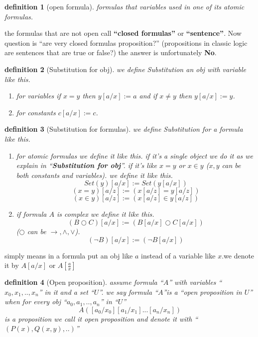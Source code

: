 \documentclass[10pt,a4paper]{book}
\newtheorem{definition}{definition}[section]
\begin{document}
%
\begin{definition}[open formula] formulas that variables used in one of its atomic formulas.
\end{definition}

the formulas that are not open call \textbf{``closed formulas''} or
\textbf{``sentence''}. Now question is ``are very closed formulas
proposition?'' (propositions in classic logic are sentences that are true or
false?) the answer is unfortunately \textbf{No}.

%
\begin{definition}[Substitution for obj] we define Substitution an obj with variable  like this.
    \begin{enumerate}
        \setlength{\itemsep}{0pt} %
        \item for variables if $x=y$ then $y[a/x]:=a$ and if $x \not= y$ then $y[a/x]:=y$.
        \item for constants $c[a/x]:=c$.
    \end{enumerate}
\end{definition}

\begin{definition}
    [Substitution for formulas] we define Substitution for a formula like this.
    \begin{enumerate}
        \setlength{\itemsep}{0pt} %
        \item for atomic formulas we define it like this. if it's a single object we do it as
              we explain in ``\textbf{Substitution for obj}''. if it's like $x = y$ or $x \in
                  y$ ($x,y$ can be both constants and variables). we define it like this.
              \[ Set(y)[a/x] := Set(y[a/x]) \]
              \[ (x=y)[a/z] := (x[a/z] = y[a/z]) \]
              \[ (x \in y)[a/z] := (x[a/z] \in y[a/z]) \]
        \item if formula $A$ is complex we define it like this.
              \[ (B \bigcirc C)[a/x] := (B[a/x] \bigcirc C[a/x]) \]
              ($\bigcirc $ can be $\to,\land ,\lor$).
              \[ (\neg B)[a/x] := (\neg B[a/x]) \]
    \end{enumerate}
\end{definition}

simply means in a formula put an obj like $a$ instead of a variable like $x$.we
denote it by $A[a/x]$ or $A[\frac{a}{x}]$

\begin{definition}
    [Open proposition] assume formula ``$A$'' with variables ``$x_0,x_1,..,x_n$'' in it and a set ``$U$''.
    we say formula ``$A$''is a ``open proposition in $U$'' when for every obj ``$a_0,a_1,..,a_n$'' in ``$U$''
    \[A([a_0/x_0][a_1/x_1]...[a_n/x_n]) \]
    is a proposition we call it open proposition and denote it with ``$(P(x)
        ,Q(x,y) ,..)$''

\end{definition}
\end{document}
